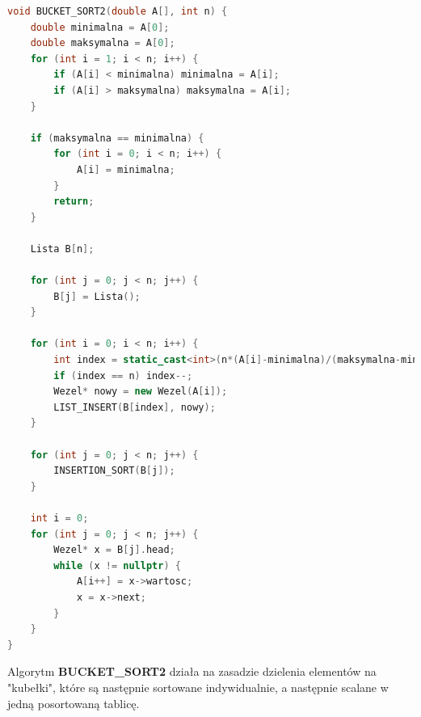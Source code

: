 \documentclass{article}
\begin{document}
			\begin{lstlisting}[language=C++, tabsize=3] 
void BUCKET_SORT2(double A[], int n) {
	double minimalna = A[0];
	double maksymalna = A[0];
	for (int i = 1; i < n; i++) {
		if (A[i] < minimalna) minimalna = A[i];
		if (A[i] > maksymalna) maksymalna = A[i];
	}
	
	if (maksymalna == minimalna) {
		for (int i = 0; i < n; i++) {
			A[i] = minimalna; 
		}
		return;
	}
	
	Lista B[n]; 
	
	for (int j = 0; j < n; j++) {
		B[j] = Lista();
	}
	
	for (int i = 0; i < n; i++) {
		int index = static_cast<int>(n*(A[i]-minimalna)/(maksymalna-minimalna)); 
		if (index == n) index--; 
		Wezel* nowy = new Wezel(A[i]);              
		LIST_INSERT(B[index], nowy);                 
	}
	
	for (int j = 0; j < n; j++) {
		INSERTION_SORT(B[j]);
	}
	
	int i = 0;
	for (int j = 0; j < n; j++) {
		Wezel* x = B[j].head;
		while (x != nullptr) {
			A[i++] = x->wartosc; 
			x = x->next;
		}
	}
}
			\end{lstlisting}
			Algorytm \textbf{BUCKET\_SORT2} działa na zasadzie dzielenia elementów na "kubełki", które są następnie sortowane indywidualnie, a następnie scalane w jedną posortowaną tablicę.
			
\end{document}
